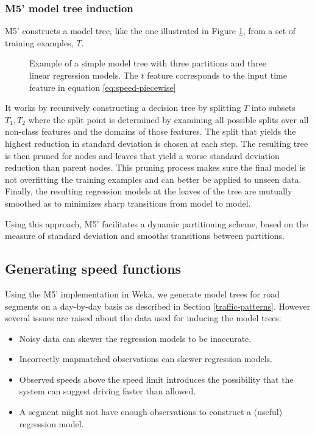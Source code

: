 \subsubsection{M5' model tree induction}
M5' constructs a model tree, like the one illustrated in Figure \ref{fig:model-tree}, from a set of training examples, $T$.
\begin{figure}[H]
	\centering
	\caption{Example of a simple model tree with three partitions and three linear regression models. The $t$ feature corresponds to the input time feature in equation \ref{eq:speed-piecewise}}
	\label{fig:model-tree}
\end{figure}
It works by recursively constructing a decision tree by splitting $T$ into subsets $T_1,T_2$ where the split point is determined by examining all possible splits over all non-class features and the domains of those features. The split that yields the highest reduction in standard deviation is chosen at each step.
The resulting tree is then pruned for nodes and leaves that yield a worse standard deviation reduction than parent nodes. This pruning process makes sure the final model is not overfitting the training examples and can better be applied to unseen data.
Finally, the resulting regression models at the leaves of the tree are mutually smoothed as to minimizes sharp transitions from model to model.

Using this approach, M5' facilitates a dynamic partitioning scheme, based on the measure of standard deviation and smooths transitions between partitions.

\subsection{Generating speed functions}
Using the M5' implementation in Weka, we generate model trees for road segments on a day-by-day basis as described in Section \ref{traffic-patterns}. However several issues are raised about the data used for inducing the model trees:
\begin{itemize}
\item Noisy data can skewer the regression models to be inaccurate.
\item Incorrectly mapmatched observations can skewer regression models.
\item Observed speeds above the speed limit introduces the possibility that the system can suggest driving faster than allowed.
\item A segment might not have enough observations to construct a (useful) regression model.
\end{itemize}
